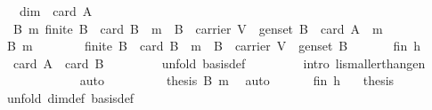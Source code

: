 \begin{isabellebody}
\ \ \ {\isachardoublequoteopen}dim\ {\isacharequal}\ card\ A{\isachardoublequoteclose}\isanewline
%
\isadelimproof
%
\endisadelimproof
%
\isatagproof
{}\isamarkupfalse%
\ {\isacharminus}\ \isanewline
\ \ \isamarkupfalse%
\ {}{\isacharcolon}\ {\isachardoublequoteopen}{\isasymAnd}B\ m{\isachardot}\ {\isacharparenleft}{\isacharparenleft}finite\ B{\isacharparenright}\ {\isasymand}\ {\isacharparenleft}card\ B\ {\isacharequal}\ m{\isacharparenright}\ {\isasymand}\ {\isacharparenleft}B\ {\isasymsubseteq}\ carrier\ V{\isacharparenright}\ {\isasymand}\ {\isacharparenleft}gen{\isacharunderscore}set\ B{\isacharparenright}{\isacharparenright}\ {\isasymLongrightarrow}\ card\ A\ {\isasymle}\ m{\isachardoublequoteclose}\isanewline
\ \ \isamarkupfalse%
\ {\isacharminus}\ \isanewline
\ \ \ \ \isamarkupfalse%
\ B\ m\ \isanewline
\ \ \ \ \isamarkupfalse%
\ {}{\isacharcolon}\ {\isachardoublequoteopen}{\isacharparenleft}{\isacharparenleft}finite\ B{\isacharparenright}\ {\isasymand}\ {\isacharparenleft}card\ B\ {\isacharequal}\ m{\isacharparenright}\ {\isasymand}\ {\isacharparenleft}B\ {\isasymsubseteq}\ carrier\ V{\isacharparenright}\ {\isasymand}\ {\isacharparenleft}gen{\isacharunderscore}set\ B{\isacharparenright}{\isacharparenright}{\isachardoublequoteclose}\isanewline
\ \ \ \ \isamarkupfalse%
\ {}\ fin\ h{}\ \isamarkupfalse%
\ {}{\isacharcolon}\ {\isachardoublequoteopen}card\ A\ {\isasymle}\ card\ B{\isachardoublequoteclose}\ \isanewline
\ \ \ \ \ \ \isamarkupfalse%
\ {\isacharparenleft}unfold\ basis{\isacharunderscore}def{\isacharparenright}\ \isanewline
\ \ \ \ \ \ \isamarkupfalse%
\ {\isacharparenleft}intro\ li{\isacharunderscore}smaller{\isacharunderscore}than{\isacharunderscore}gen{\isacharparenright}\ \isanewline
\ \ \ \ \ \ \ \ \ \ \ \isamarkupfalse%
\ auto\isanewline
\ \ \ \ \isamarkupfalse%
\ {}\ {}\ \isamarkupfalse%
\ {\isachardoublequoteopen}{\isacharquery}thesis\ B\ m{\isachardoublequoteclose}\ \isamarkupfalse%
\ auto\isanewline
\ \ \isamarkupfalse%
\isanewline
\ \ \isamarkupfalse%
\ fin\ h{}\ {}\ \isamarkupfalse%
\ {\isacharquery}thesis\isanewline
\ \ \ \ \isamarkupfalse%
\ {\isacharparenleft}unfold\ dim{\isacharunderscore}def\ basis{\isacharunderscore}def{\isacharparenright}\ \isanewline

\end{isabellebody}
